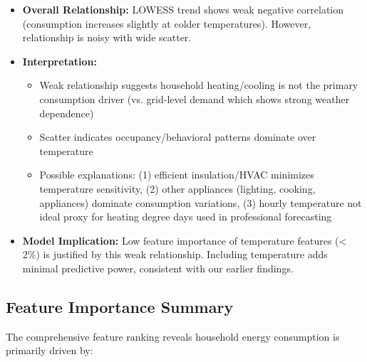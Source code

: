 \documentclass[11pt, a4paper, oneside]{article}
\begin{document}
\begin{itemize}
    \item \textbf{Overall Relationship:} LOWESS trend shows weak negative correlation (consumption increases slightly at colder temperatures). However, relationship is noisy with wide scatter.
    
    \item \textbf{Interpretation:} 
    \begin{itemize}
        \item Weak relationship suggests household heating/cooling is not the primary consumption driver (vs. grid-level demand which shows strong weather dependence)
        \item Scatter indicates occupancy/behavioral patterns dominate over temperature
        \item Possible explanations: (1) efficient insulation/HVAC minimizes temperature sensitivity, (2) other appliances (lighting, cooking, appliances) dominate consumption variations, (3) hourly temperature not ideal proxy for heating degree days used in professional forecasting
    \end{itemize}
    
    \item \textbf{Model Implication:} Low feature importance of temperature features (< 2\%) is justified by this weak relationship. Including temperature adds minimal predictive power, consistent with our earlier findings.
\end{itemize}

\subsection{Feature Importance Summary}

The comprehensive feature ranking reveals household energy consumption is primarily driven by:
\end{document}
